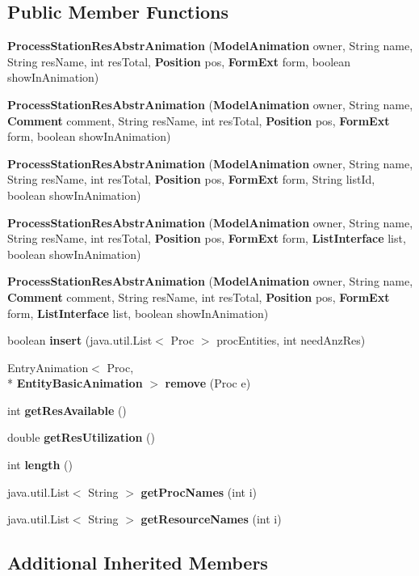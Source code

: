 \subsection*{Public Member Functions}
\begin{DoxyCompactItemize}
\item 
{\bf Process\-Station\-Res\-Abstr\-Animation} ({\bf Model\-Animation} owner, String name, String res\-Name, int res\-Total, {\bf Position} pos, {\bf Form\-Ext} form, boolean show\-In\-Animation)
\item 
{\bf Process\-Station\-Res\-Abstr\-Animation} ({\bf Model\-Animation} owner, String name, {\bf Comment} comment, String res\-Name, int res\-Total, {\bf Position} pos, {\bf Form\-Ext} form, boolean show\-In\-Animation)
\item 
{\bf Process\-Station\-Res\-Abstr\-Animation} ({\bf Model\-Animation} owner, String name, String res\-Name, int res\-Total, {\bf Position} pos, {\bf Form\-Ext} form, String list\-Id, boolean show\-In\-Animation)
\item 
{\bf Process\-Station\-Res\-Abstr\-Animation} ({\bf Model\-Animation} owner, String name, String res\-Name, int res\-Total, {\bf Position} pos, {\bf Form\-Ext} form, {\bf List\-Interface} list, boolean show\-In\-Animation)
\item 
{\bf Process\-Station\-Res\-Abstr\-Animation} ({\bf Model\-Animation} owner, String name, {\bf Comment} comment, String res\-Name, int res\-Total, {\bf Position} pos, {\bf Form\-Ext} form, {\bf List\-Interface} list, boolean show\-In\-Animation)
\item 
boolean {\bf insert} (java.\-util.\-List$<$ Proc $>$ proc\-Entities, int need\-Anz\-Res)
\item 
Entry\-Animation$<$ Proc, \\*
{\bf Entity\-Basic\-Animation} $>$ {\bf remove} (Proc e)
\item 
int {\bf get\-Res\-Available} ()
\item 
double {\bf get\-Res\-Utilization} ()
\item 
int {\bf length} ()
\item 
java.\-util.\-List$<$ String $>$ {\bf get\-Proc\-Names} (int i)
\item 
java.\-util.\-List$<$ String $>$ {\bf get\-Resource\-Names} (int i)
\end{DoxyCompactItemize}
\subsection*{Additional Inherited Members}


